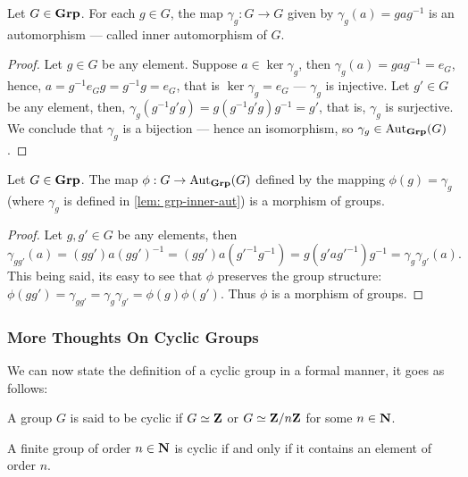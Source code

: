 \begin{lemma}\label{lem: grp-inner-aut}
Let \(G \in {\textbf{Grp}}\). For each \(g \in G\), the map \(\gamma_g: G \to G\) given
by \(\gamma_g(a) = gag^{-1}\) is an automorphism --- called inner
automorphism of \(G\).
\end{lemma}

\begin{proof}
Let \(g \in G\) be any element. Suppose \(a \in \ker\gamma_g\), then
\(\gamma_g(a) = gag^{-1} = e_G\), hence, \(a = g^{-1} e_G g = g^{-1}g = e_G\),
that is \(\ker\gamma_g = e_G\) --- \(\gamma_g\) is injective. Let \(g' \in G\)
be any element, then, \(\gamma_g(g^{-1} g' g) = g (g^{-1} g' g) g^{-1} = g'\),
that is, \(\gamma_g\) is surjective. We conclude that \(\gamma_g\) is a
bijection --- hence an isomorphism, so \(\gamma_g \in \operatorname{Aut}_{\textbf{Grp}}(G)\).
\end{proof}

\begin{lemma}\label{lem: grp-inner-aut-cor}
Let \(G \in {\textbf{Grp}}\). The map \(\phi: G \to \operatorname{Aut}_{\textbf{Grp}}(G)\) defined by the
mapping \(\phi(g) = \gamma_g\) (where \(\gamma_g\) is defined in \cref{lem:
grp-inner-aut}) is a morphism of groups.
\end{lemma}

\begin{proof}
Let \(g, g' \in G\) be any elements, then
\[
  \gamma_{gg'}(a) = (gg')a{(gg')}^{-1} = (g g') a (g'^{-1} g^{-1})
  = g(g' a g'^{-1}) g^{-1} = \gamma_g \gamma_{g'}(a).
\]
This being said, its easy to see that \(\phi\) preserves the group structure:
\(\phi(gg') = \gamma_{gg'} = \gamma_g \gamma_{g'} = \phi(g) \phi(g')\). Thus
\(\phi\) is a morphism of groups.
\end{proof}

\subsubsection{More Thoughts On Cyclic Groups}

We can now state the definition of a cyclic group in a formal manner, it goes as
follows:

\begin{definition}\label{def: cyclic-grp}
A group \(G\) is said to be cyclic if \(G \simeq \mathbf{Z}\) or \(G \simeq \mathbf{Z}/n\mathbf{Z}\) for
some \(n \in \mathbf{N}\).
\end{definition}

\begin{proposition}
A finite group of order \(n \in \mathbf{N}\) is cyclic if and only if it contains an
element of order \(n\).
\end{proposition}

